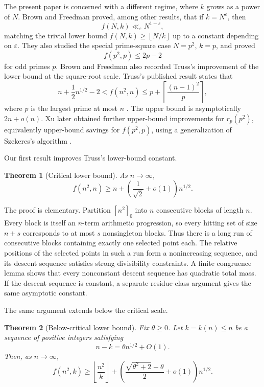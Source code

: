 \documentclass[10pt,a4paper]{amsart}
\newtheorem{theorem}{Theorem}[section]
\newcommand{\floor}[1]{\left\lfloor #1\right\rfloor}
\newcommand{\ceil}[1]{\left\lceil #1\right\rceil}
\numberwithin{equation}{section}
\begin{document}
The present paper is concerned with a different regime, where $k$ grows as a power of $N$.
Brown and Freedman proved, among other results, that if $k=N^\varepsilon$, then
\[
        f(N,k)\ll_\varepsilon N^{1-\varepsilon},
\]
matching the trivial lower bound $f(N,k)\ge \floor{N/k}$ up to a constant depending on $\varepsilon$.
They also studied the special prime-square case $N=p^2$, $k=p$, and proved
\[
        f(p^2,p)\le 2p-2
\]
for odd primes $p$.
Brown and Freedman also recorded Truss's improvement of the lower bound at the square-root scale.
Truss's published result states that
\[
        n+\frac12 n^{1/2}-2
        <
        f(n^2,n)
        \le
        p+\ceil{\frac{(n-1)^2}{p}},
\]
where $p$ is the largest prime at most $n$ \cite{Truss}.
The upper bound is asymptotically $2n+o(n)$.
Xu later obtained further upper-bound improvements for $r_p(p^2)$, equivalently upper-bound savings for $f(p^2,p)$, using a generalization of Szekeres's algorithm \cite{Xu}.

Our first result improves Truss's lower-bound constant.

\begin{theorem}[Critical lower bound]\label{thm:critical}
As $n\to\infty$,
\[
        f(n^2,n)
        \ge
        n+\left(\frac1{\sqrt2}+o(1)\right)n^{1/2}.
\]
\end{theorem}

The proof is elementary.
Partition $[n^2]_0$ into $n$ consecutive blocks of length $n$.
Every block is itself an $n$-term arithmetic progression, so every hitting set of size $n+s$ corresponds to at most $s$ nonsingleton blocks.
Thus there is a long run of consecutive blocks containing exactly one selected point each.
The relative positions of the selected points in such a run form a nonincreasing sequence, and its descent sequence satisfies strong divisibility constraints.
A finite congruence lemma shows that every nonconstant descent sequence has quadratic total mass.
If the descent sequence is constant, a separate residue-class argument gives the same asymptotic constant.

The same argument extends below the critical scale.


\begin{theorem}[Below-critical lower bound]\label{thm:below}
Fix $\theta\ge0$.
Let $k=k(n)\le n$ be a sequence of positive integers satisfying
\[
        n-k=\theta n^{1/2}+O(1).
\]
Then, as $n\to\infty$,
\[
        f(n^2,k)
        \ge
        \floor{\frac{n^2}{k}}
        +
        \left(\frac{\sqrt{\theta^2+2}-\theta}{2}+o(1)\right)n^{1/2}.
\]
\end{theorem}
\end{document}
